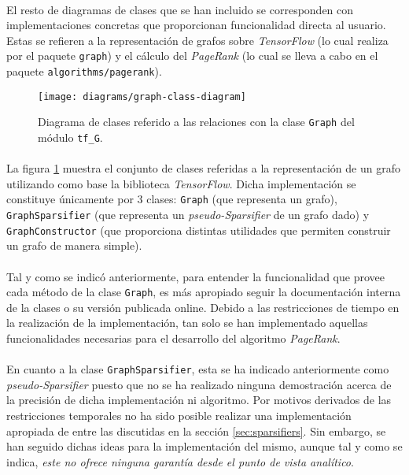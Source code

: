 \documentclass{subfiles}
\begin{document}
          \paragraph{}
          El resto de diagramas de clases que se han incluido se corresponden con implementaciones concretas que proporcionan funcionalidad directa al usuario. Estas se refieren a la representación de grafos sobre \emph{TensorFlow} (lo cual realiza por el paquete \texttt{graph}) y el cálculo del \emph{PageRank} (lo cual se lleva a cabo en el paquete \texttt{algorithms/pagerank}).

          \begin{figure}[h!]
            \centering
            \texttt{[image: diagrams/graph-class-diagram]}
            \caption{Diagrama de clases referido a las relaciones con la clase \texttt{Graph} del módulo \texttt{tf\_G}.}
            \label{img:graph_class_diagram}
          \end{figure}

          \paragraph{}
          La figura \ref{img:graph_class_diagram} muestra el conjunto de clases referidas a la representación de un grafo utilizando como base la biblioteca \emph{TensorFlow}. Dicha implementación se constituye únicamente por 3 clases: \texttt{Graph} (que representa un grafo), \texttt{GraphSparsifier} (que representa un \emph{pseudo-Sparsifier} de un grafo dado) y \texttt{GraphConstructor} (que proporciona distintas utilidades que permiten construir un grafo de manera simple).

          \paragraph{}
          Tal y como se indicó anteriormente, para entender la funcionalidad que provee cada método de la clase \texttt{Graph}, es más apropiado seguir la documentación interna de la clases o su versión publicada online. Debido a las restricciones de tiempo en la realización de la implementación, tan solo se han implementado aquellas funcionalidades necesarias para el desarrollo del algoritmo \emph{PageRank}.

          \paragraph{}
          En cuanto a la clase \texttt{GraphSparsifier}, esta se ha indicado anteriormente como \emph{pseudo-Sparsifier} puesto que no se ha realizado ninguna demostración acerca de la precisión de dicha implementación ni algoritmo. Por motivos derivados de las restricciones temporales no ha sido posible realizar una implementación apropiada de entre las discutidas en la sección \ref{sec:sparsifiers}. Sin embargo, se han seguido dichas ideas para la implementación del mismo, aunque tal y como se indica, \emph{este no ofrece ninguna garantía desde el punto de vista analítico}.
\end{document}
